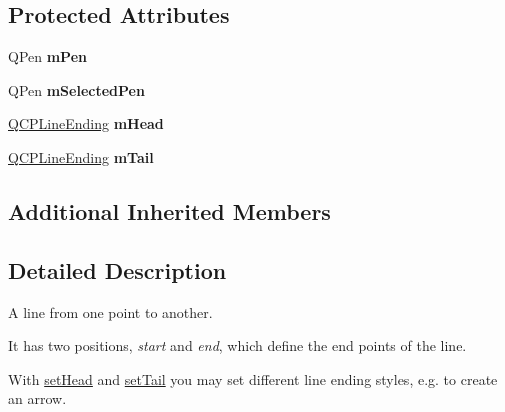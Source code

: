 \subsection*{Protected Attributes}
\begin{DoxyCompactItemize}
\item 
\hypertarget{classQCPItemLine_abbb544d5bb927dfe4e81a7f3ca4c65ac}{Q\-Pen {\bfseries m\-Pen}}\label{classQCPItemLine_abbb544d5bb927dfe4e81a7f3ca4c65ac}

\item 
\hypertarget{classQCPItemLine_aff858ad6dde3b90024814ca4b116f278}{Q\-Pen {\bfseries m\-Selected\-Pen}}\label{classQCPItemLine_aff858ad6dde3b90024814ca4b116f278}

\item 
\hypertarget{classQCPItemLine_a51603f28ab7ddb1c1a95ea384791d3ed}{\hyperlink{classQCPLineEnding}{Q\-C\-P\-Line\-Ending} {\bfseries m\-Head}}\label{classQCPItemLine_a51603f28ab7ddb1c1a95ea384791d3ed}

\item 
\hypertarget{classQCPItemLine_ab8ed61dfe15bbb1cbf9b95eae95e242f}{\hyperlink{classQCPLineEnding}{Q\-C\-P\-Line\-Ending} {\bfseries m\-Tail}}\label{classQCPItemLine_ab8ed61dfe15bbb1cbf9b95eae95e242f}

\end{DoxyCompactItemize}
\subsection*{Additional Inherited Members}


\subsection{Detailed Description}
A line from one point to another. 

 It has two positions, {\itshape start} and {\itshape end}, which define the end points of the line.

With \hyperlink{classQCPItemLine_aebf3d687114d584e0459db6759e2c3c3}{set\-Head} and \hyperlink{classQCPItemLine_ac264222c3297a7efe33df9345c811a5f}{set\-Tail} you may set different line ending styles, e.\-g. to create an arrow. 

